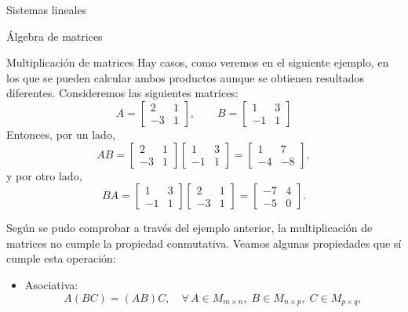 \documentclass[a4paper,12pt,twoside,spanish]{amsbook}
\theoremstyle{definition}
\theoremstyle{remark}
\begin{document}
\begin{chapter}{Sistemas lineales}
\begin{section}{Álgebra de matrices}
\begin{subsection}{Multiplicación de matrices}
				Hay casos, como veremos en el siguiente ejemplo, en los que se pueden calcular ambos productos aunque se obtienen resultados diferentes. Consideremos las siguientes matrices:
				\begin{equation*}
				A = \begin{bmatrix}2&1\\-3&1\end{bmatrix}, \qquad 
				B = \begin{bmatrix}1&3\\-1&1\end{bmatrix}
				\end{equation*}
				Entonces, por un lado,
				\begin{equation*}
				AB = \begin{bmatrix}2&1\\-3&1\end{bmatrix}
				\begin{bmatrix}1&3\\-1&1\end{bmatrix} =
				\begin{bmatrix}1&7\\-4&-8\end{bmatrix}, 
				\end{equation*}
				y por otro lado,
				\begin{equation*}
				BA = \begin{bmatrix}1&3\\-1&1\end{bmatrix} \begin{bmatrix}2&1\\-3&1\end{bmatrix}
				=\begin{bmatrix}-7&4\\-5&0\end{bmatrix}.
				\end{equation*}
				
				Según se pudo comprobar a través del ejemplo anterior, la multiplicación de matrices
				no cumple la propiedad conmutativa. Veamos algunas propiedades que sí cumple esta operación:
				\begin{itemize}
					\item Asociativa: 
					\begin{equation*}
					A (B C) = (A B) C, \quad\forall\, A \in M_{m \times n}, \;B \in M_{n \times p}, \;C  \in M_{p \times q},
					\end{equation*}
					

\end{itemize}
\end{subsection}
\end{section}
\end{chapter}
\end{document}

